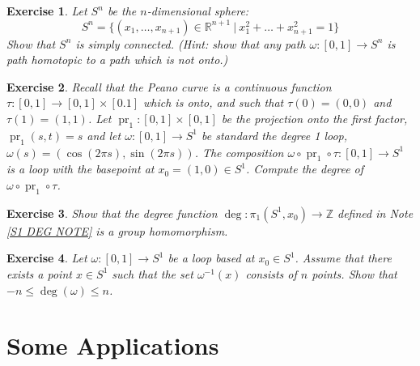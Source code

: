 \documentclass[11pt, letterpaper, oneside]{report}
\renewcommand{\chaptermark}[1]{\markboth{#1}{}}
\theoremstyle{pplain}
\theoremstyle{ddefinition}
\theoremstyle{nnn}
\theoremstyle{eexercise}
\newtheorem{exercise}{Exercise}[chapter]
\newcommand{\Z}{{\mathbb Z}}
\newcommand{\R}{{\mathbb R}}
\DeclareMathOperator\pr{pr}
\begin{document}
\begin{exercise}
Let $S^{n}$ be the $n$-dimensional sphere:
$$S^{n} = \{ (x_{1}, \dots, x_{n+1}) \in \R^{n+1} \ | \ x_{1}^{2} + {\dots} + x_{n+1}^{2} = 1\}$$
Show that $S^{n}$ is simply connected. (Hint: show that any path $\omega\colon [0, 1] \to S^{n}$
is path homotopic to a path which is not onto.)
\end{exercise}


\begin{exercise}
Recall that the Peano curve is a continuous function $\tau \colon [0, 1] \to [0, 1]\times [0. 1]$ which is onto, 
and such that $\tau(0) = (0, 0)$ and $\tau(1) = (1, 1)$. Let $\pr_{1}\colon [0, 1] \times [0, 1]$ be the projection 
onto the first factor, $\pr_{1}(s, t) = s$ and let $\omega\colon [0, 1] \to S^{1}$ be standard the degree 1 loop, 
$\omega(s) = (\cos(2\pi s), \sin(2 \pi s))$.  The composition $\omega \circ \pr_{1}\circ \tau \colon [0, 1] \to S^{1}$
is a loop with the basepoint at $x_{0} = (1, 0)\in S^{1}$. Compute the degree of $\omega \circ \pr_{1}\circ \tau$. 
\end{exercise}








\begin{exercise}
Show that the degree function $\deg\colon \pi_{1}(S^{1}, x_{0}) \to \Z$  defined in Note \ref{S1 DEG NOTE}
is a group homomorphism. 
\end{exercise}



\begin{exercise}
Let $\omega \colon [0, 1] \to S^{1}$ be a loop based at  $x_{0}\in S^{1}$. Assume that there exists a point 
$x\in S^{1}$ such that the set $\omega^{-1}(x)$ consists of $n$ points. Show that $-n \leq \deg(\omega) \leq n$. 
\end{exercise}


\newpage

\chapter{Some Applications}
\chaptermark{Some Applications}
\label{SOME APPLICATIONS CHAPTER}

\thispagestyle{firststyle}
\end{document}
